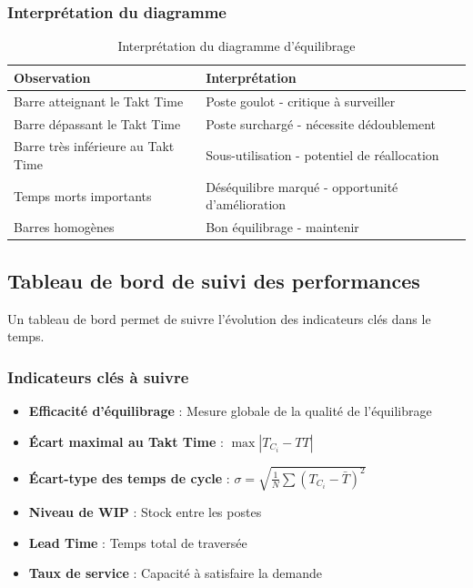 \documentclass[12pt,a4paper]{article}
\newenvironment{methodbox}[1]
  {\begin{tcolorbox}[colback=blue!5!white, colframe=methodcolor, title=#1]\small}
  {\end{tcolorbox}}
\begin{document}
\subsubsection{Interprétation du diagramme}

\begin{table}[H]
\centering
\begin{tabular}{|p{4cm}|p{8cm}|}
\hline
\textbf{Observation} & \textbf{Interprétation} \\
\hline
Barre atteignant le Takt Time & Poste goulot - critique à surveiller \\
\hline
Barre dépassant le Takt Time & Poste surchargé - nécessite dédoublement \\
\hline
Barre très inférieure au Takt Time & Sous-utilisation - potentiel de réallocation \\
\hline
Temps morts importants & Déséquilibre marqué - opportunité d'amélioration \\
\hline
Barres homogènes & Bon équilibrage - maintenir \\
\hline
\end{tabular}
\caption{Interprétation du diagramme d'équilibrage}
\end{table}

\subsection{Tableau de bord de suivi des performances}

Un tableau de bord permet de suivre l'évolution des indicateurs clés dans le temps.

\subsubsection{Indicateurs clés à suivre}

\begin{methodbox}{Indicateurs essentiels}
\begin{itemize}
    \item \textbf{Efficacité d'équilibrage} : Mesure globale de la qualité de l'équilibrage
    \item \textbf{Écart maximal au Takt Time} : $\max|T_{C_i} - TT|$
    \item \textbf{Écart-type des temps de cycle} : $\sigma = \sqrt{\frac{1}{N}\sum(T_{C_i} - \bar{T})^2}$
    \item \textbf{Niveau de WIP} : Stock entre les postes
    \item \textbf{Lead Time} : Temps total de traversée
    \item \textbf{Taux de service} : Capacité à satisfaire la demande
\end{itemize}
\end{methodbox}
\end{document}
